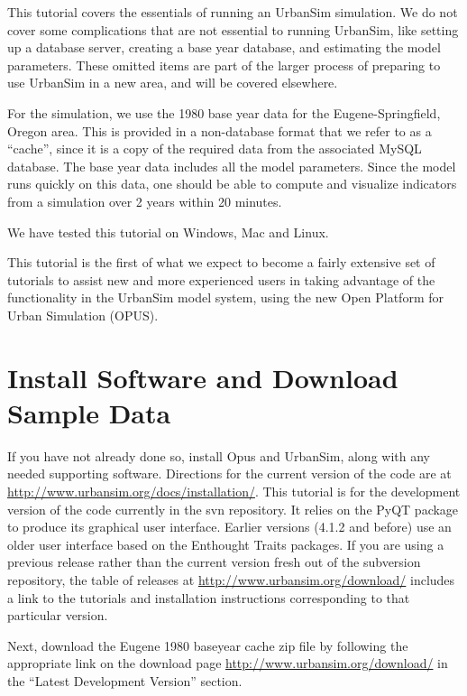 \documentclass{howto}
\begin{document}
This tutorial covers the essentials of running an UrbanSim simulation.
We do not cover some complications that are not essential to running
UrbanSim, like setting up a database server, creating a base year database, and
estimating the model parameters.  These omitted items are part of the larger
process of preparing to use UrbanSim in a new area, and will be covered
elsewhere.

For the simulation, we use the 1980 base year data for the
Eugene-Springfield, Oregon area.  This is provided in a non-database
format that we refer to as a ``cache'', since it is a copy of the
required data from the associated MySQL database. The base year data
includes all the model parameters.  Since the model runs quickly on this data, one should be able to
compute and visualize indicators from a simulation over 2 years
within 20 minutes.

We have tested this tutorial on Windows, Mac and Linux.

This tutorial is the first of what we expect to become a fairly extensive
set of tutorials to assist new and more experienced users in taking
advantage of the functionality in the UrbanSim model system, using
the new Open Platform for Urban Simulation (OPUS).

\section*{Install Software and Download Sample Data}

If you have not already done so, install Opus and UrbanSim, along with
any needed supporting software.  Directions for the current version of
the code are at \url{http://www.urbansim.org/docs/installation/}.  
This tutorial is for the development version of the code currently in 
the svn repository.    It relies on the PyQT package to produce its 
graphical user interface. Earlier versions (4.1.2 and before) use an
older user interface based on the Enthought Traits packages.  If
you are using a previous release rather than the current
version fresh out of the subversion repository, the table of releases
at \url{http://www.urbansim.org/download/} includes a link to the 
tutorials and installation
instructions corresponding to that particular version.

Next, download the Eugene 1980 baseyear cache zip file by following the 
appropriate link on the download page 
\url{http://www.urbansim.org/download/} in the ``Latest Development Version''
section.
\end{document}

